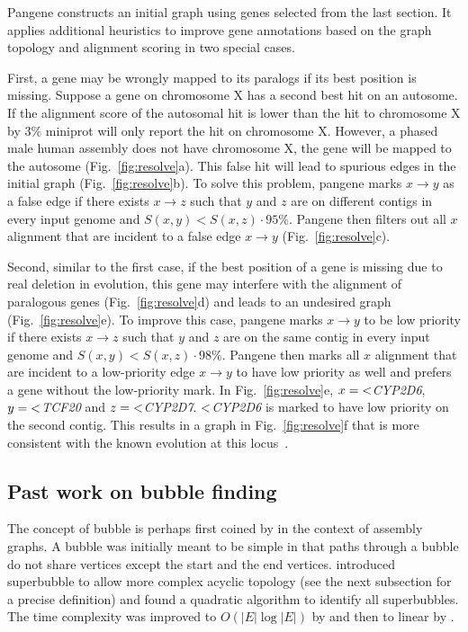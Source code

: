 \documentclass[webpdf,contemporary,large,namedate]{oup-authoring-template}%
\begin{document}
Pangene constructs an initial graph using genes selected from the last section.
It applies additional heuristics to improve gene annotations based on the graph topology and alignment scoring
in two special cases.

First, a gene may be wrongly mapped to its paralogs if its best position is missing.
Suppose a gene on chromosome X has a second best hit on an autosome.
If the alignment score of the autosomal hit is lower than the hit to chromosome X by 3\%
miniprot will only report the hit on chromosome X.
However, a phased male human assembly does not have chromosome X,
the gene will be mapped to the autosome (Fig.~\ref{fig:resolve}a).
This false hit will lead to spurious edges in the initial graph (Fig.~\ref{fig:resolve}b).
To solve this problem, pangene marks $x\to y$ as a false edge
if there exists $x\to z$ such that $y$ and $z$ are on different contigs in every input genome and $S(x,y)<S(x,z)\cdot 95\%$.
Pangene then filters out all $x$ alignment that are incident to a false edge $x\to y$ (Fig.~\ref{fig:resolve}c).

Second, similar to the first case, if the best position of a gene is missing due to real deletion in evolution,
this gene may interfere with the alignment of paralogous genes (Fig.~\ref{fig:resolve}d)
and leads to an undesired graph (Fig.~\ref{fig:resolve}e).
To improve this case, pangene marks $x\to y$ to be low priority
if there exists $x\to z$ such that $y$ and $z$ are on the same contig in every input genome and $S(x,y)<S(x,z)\cdot 98\%$.
Pangene then marks all $x$ alignment that are incident to a low-priority edge $x\to y$ to have low priority as well
and prefers a gene without the low-priority mark.
In Fig.~\ref{fig:resolve}e, $x={\rm <}$\emph{CYP2D6}, $y={\rm <}$\emph{TCF20} and $z={\rm <}$\emph{CYP2D7}.
${\rm <}$\emph{CYP2D6} is marked to have low priority on the second contig.
This results in a graph in Fig.~\ref{fig:resolve}f that is more consistent with the known evolution at this locus~\citep{Liao:2023aa}.

\subsection{Past work on bubble finding}

The concept of bubble is perhaps first coined by \citet{Zerbino:2008uq} in the context of assembly graphs.
A bubble was initially meant to be simple in that paths through a bubble do not share vertices except the start and the end vertices.
\citet{DBLP:conf/wabi/OnoderaSS13} introduced superbubble to allow more complex acyclic topology (see the next subsection for a precise definition)
and found a quadratic algorithm to identify all superbubbles.
The time complexity was improved to $O(|E|\log|E|)$ by \citet{Sung:2015aa}
and then to linear by \citet{DBLP:journals/tcs/BrankovicIKMPV16}.
\end{document}

